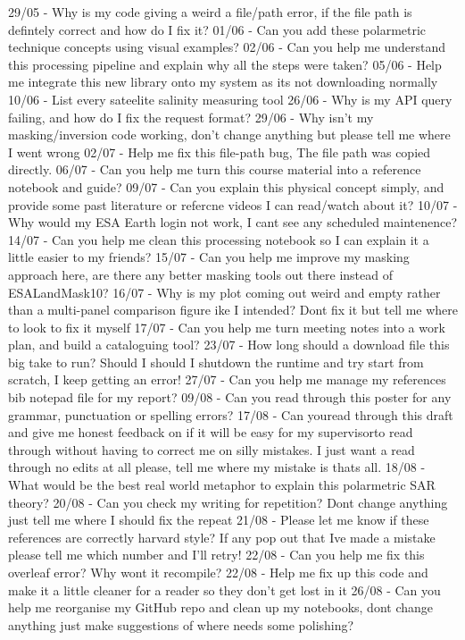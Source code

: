 29/05 - Why is my code giving a weird a file/path error, if the file path is defintely correct and how do I fix it?
01/06 - Can you add these polarmetric technique concepts using visual examples?
02/06 - Can you help me understand this processing pipeline and explain why all the steps were taken?
05/06 - Help me integrate this new library onto my system as its not downloading normally
10/06 - List every sateelite salinity measuring tool
26/06 - Why is my API query failing, and how do I fix the request format?
29/06 - Why isn't my masking/inversion code working, don't change anything but please tell me where I went wrong
02/07 - Help me fix this file-path bug, The file path was copied directly.
06/07 - Can you help me turn this course material into a reference notebook and guide?
09/07 - Can you explain this physical concept simply, and provide some past literature or refercne videos I can read/watch about it?
10/07 - Why would my ESA Earth login not work, I cant see any scheduled maintenence?
14/07 - Can you help me clean this processing notebook so I can explain it a little easier to my friends?
15/07 - Can you help me improve my masking approach here, are there any better masking tools out there instead of ESALandMask10?
16/07 - Why is my plot coming out weird and empty rather than a multi-panel comparison figure ike I intended? Dont fix it but tell me where to look to fix it myself
17/07 - Can you help me turn meeting notes into a work plan, and build a cataloguing tool?
23/07 - How long should a download file this big take to run? Should I should I shutdown the runtime and try start from scratch, I keep getting an error!
27/07 - Can you help me manage my references bib notepad file for my report?
09/08 - Can you read through this poster for any grammar, punctuation or spelling errors?
17/08 - Can youread through this draft and give me honest feedback on if it will be easy for my supervisorto read through without having to correct me on silly mistakes. I just want a read through no edits at all please, tell me where my mistake is thats all.
18/08 - What would be the best real world metaphor to explain this polarmetric SAR theory?
20/08 - Can you check my writing for repetition? Dont change anything just tell me where I should fix the repeat
21/08 - Please let me know if these references are correctly harvard style? If any pop out that Ive made a mistake please tell me which number and I'll retry!
22/08 - Can you help me fix this overleaf error? Why wont it recompile?
22/08 - Help me fix up this code and make it a little cleaner for a reader so they don't get lost in it
26/08 - Can you help me reorganise my GitHub repo and clean up my notebooks, dont change anything just make suggestions of where needs some polishing?
